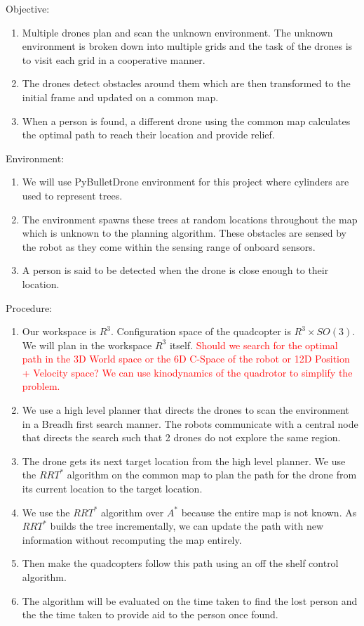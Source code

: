 Objective:
\begin{enumerate}
    \item Multiple drones plan and scan the unknown environment. The unknown environment is broken down into multiple grids and the task of the drones is to visit each grid in a cooperative manner.
    \item The drones detect obstacles around them which are then transformed to the initial frame and updated on a common map.
    \item When a person is found, a different drone using the common map calculates the optimal path to reach their location and provide relief.
\end{enumerate}
Environment:
\begin{enumerate}
    \item We will use PyBulletDrone environment for this project where cylinders are used to represent trees.
    \item The environment spawns these trees at random locations throughout the map which is unknown to the planning algorithm. These obstacles are sensed by the robot as they come within the sensing range of onboard sensors.
    \item A person is said to be detected when the drone is close enough to their location.
\end{enumerate}
Procedure:
\begin{enumerate}
    \item Our workspace is \(R^3\). Configuration space of the quadcopter is \(R^3 \times SO(3)\). We will plan in the workspace \(R^3\) itself. \textcolor{red}{Should we search for the optimal path in the 3D World space or the 6D C-Space of the robot or 12D Position + Velocity space? We can use kinodynamics of the quadrotor to simplify the problem.}
    \item We use a high level planner that directs the drones to scan the environment in a Breadh first search manner. The robots communicate with a central node that directs the search such that 2 drones do not explore the same region.
    \item The drone gets its next target location from the high level planner. We use the \(RRT^*\) algorithm on the common map to plan the path for the drone from its current location to the target location.
    \item We use the \(RRT^*\) algorithm over \(A^*\) because the entire map is not known. As \(RRT^*\) builds the tree incrementally, we can update the path with new information without recomputing the map entirely.
    \item Then make the quadcopters follow this path using an off the shelf control algorithm.
    \item The algorithm will be evaluated on the time taken to find the lost person and the the time taken to provide aid to the person once found.
\end{enumerate}
